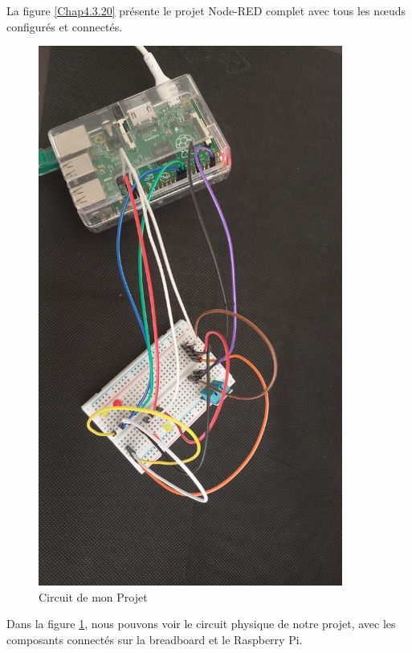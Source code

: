 La figure \ref{Chap4.3.20} présente le projet Node-RED complet avec tous les nœuds configurés et connectés.

\begin{figure}[H]
\centering
\includegraphics[width=10cm]{Images/Node-11.jpg}
\caption{Circuit de mon Projet}
\label{Chap4.3.21}
\end{figure}

Dans la figure \ref{Chap4.3.21}, nous pouvons voir le circuit physique de notre projet, avec les composants connectés sur la breadboard et le Raspberry Pi.

